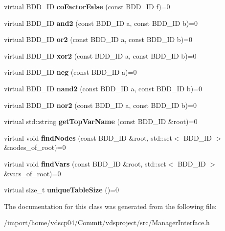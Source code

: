 \begin{DoxyCompactItemize}
\item 
virtual B\+D\+D\+\_\+\+ID {\bfseries co\+Factor\+False} (const B\+D\+D\+\_\+\+ID f)=0\label{classClassProject_1_1ManagerInterface_a308c99661ad02f407d6f2b0af6230e80}

\item 
virtual B\+D\+D\+\_\+\+ID {\bfseries and2} (const B\+D\+D\+\_\+\+ID a, const B\+D\+D\+\_\+\+ID b)=0\label{classClassProject_1_1ManagerInterface_af914326d34a1ed42710f7b11e5baf010}

\item 
virtual B\+D\+D\+\_\+\+ID {\bfseries or2} (const B\+D\+D\+\_\+\+ID a, const B\+D\+D\+\_\+\+ID b)=0\label{classClassProject_1_1ManagerInterface_a8dbfde761b1e94d1f222b4d27f3c6fbc}

\item 
virtual B\+D\+D\+\_\+\+ID {\bfseries xor2} (const B\+D\+D\+\_\+\+ID a, const B\+D\+D\+\_\+\+ID b)=0\label{classClassProject_1_1ManagerInterface_a2b2c4948ef41ddb1036289cd07dac156}

\item 
virtual B\+D\+D\+\_\+\+ID {\bfseries neg} (const B\+D\+D\+\_\+\+ID a)=0\label{classClassProject_1_1ManagerInterface_a57d34af3121dcf5366d22ecf792f05a0}

\item 
virtual B\+D\+D\+\_\+\+ID {\bfseries nand2} (const B\+D\+D\+\_\+\+ID a, const B\+D\+D\+\_\+\+ID b)=0\label{classClassProject_1_1ManagerInterface_aaf6e357d680613e449d3ea958c9abba1}

\item 
virtual B\+D\+D\+\_\+\+ID {\bfseries nor2} (const B\+D\+D\+\_\+\+ID a, const B\+D\+D\+\_\+\+ID b)=0\label{classClassProject_1_1ManagerInterface_a312d9865eae2d6355e17855cba78bc78}

\item 
virtual std\+::string {\bfseries get\+Top\+Var\+Name} (const B\+D\+D\+\_\+\+ID \&root)=0\label{classClassProject_1_1ManagerInterface_afde45b2065361dfa6e61c1c7bc3fc1b4}

\item 
virtual void {\bfseries find\+Nodes} (const B\+D\+D\+\_\+\+ID \&root, std\+::set$<$ B\+D\+D\+\_\+\+ID $>$ \&nodes\+\_\+of\+\_\+root)=0\label{classClassProject_1_1ManagerInterface_ab460e331ffdb85d4128574b3aae72c1e}

\item 
virtual void {\bfseries find\+Vars} (const B\+D\+D\+\_\+\+ID \&root, std\+::set$<$ B\+D\+D\+\_\+\+ID $>$ \&vars\+\_\+of\+\_\+root)=0\label{classClassProject_1_1ManagerInterface_ab94feabca2125d334e542e502ae0186d}

\item 
virtual size\+\_\+t {\bfseries unique\+Table\+Size} ()=0\label{classClassProject_1_1ManagerInterface_a85cac80444b26e5b80eb96b9f1231c0e}

\end{DoxyCompactItemize}


The documentation for this class was generated from the following file\+:\begin{DoxyCompactItemize}
\item 
/import/home/vdscp04/\+Commit/vdsproject/src/Manager\+Interface.\+h\end{DoxyCompactItemize}
